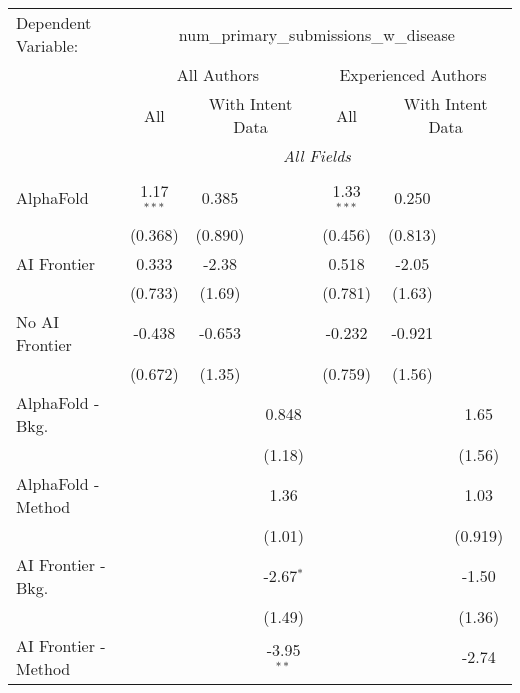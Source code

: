 \begingroup
\centering
\begin{tabular}{lcccccc}
   \tabularnewline \midrule \midrule
   Dependent Variable: & \multicolumn{6}{c}{num\_primary\_submissions\_w\_disease}\\
 & \multicolumn{3}{c}{All Authors} & \multicolumn{3}{c}{Experienced Authors} \\
\cmidrule(lr){2-4} \cmidrule(lr){5-7}
 & \multicolumn{1}{c}{All} & \multicolumn{2}{c}{With Intent Data} & \multicolumn{1}{c}{All} & \multicolumn{2}{c}{With Intent Data} \\
\cmidrule(lr){2-2} \cmidrule(lr){3-4} \cmidrule(lr){5-5} \cmidrule(lr){6-7}
 & \multicolumn{6}{c}{\textit{All Fields}} \\ \\
   AlphaFold               & 1.17$^{***}$ & 0.385   &               & 1.33$^{***}$ & 0.250   &   \\   
                           & (0.368)      & (0.890) &               & (0.456)      & (0.813) &   \\   
   AI Frontier             & 0.333        & -2.38   &               & 0.518        & -2.05   &   \\   
                           & (0.733)      & (1.69)  &               & (0.781)      & (1.63)  &   \\   
   No AI Frontier          & -0.438       & -0.653  &               & -0.232       & -0.921  &   \\   
                           & (0.672)      & (1.35)  &               & (0.759)      & (1.56)  &   \\   
   AlphaFold - Bkg.        &              &         & 0.848         &              &         & 1.65\\   
                           &              &         & (1.18)        &              &         & (1.56)\\   
   AlphaFold - Method      &              &         & 1.36          &              &         & 1.03\\   
                           &              &         & (1.01)        &              &         & (0.919)\\   
   AI Frontier - Bkg.      &              &         & -2.67$^{*}$   &              &         & -1.50\\   
                           &              &         & (1.49)        &              &         & (1.36)\\   
   AI Frontier - Method    &              &         & -3.95$^{**}$  &              &         & -2.74\\   

\end{tabular}
